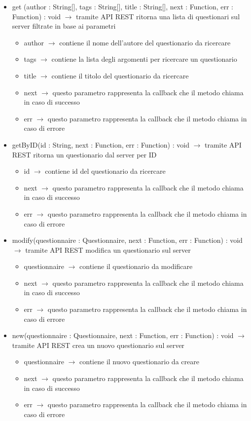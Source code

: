\begin{description}
\begin{itemize}
	\item get (author : String[], tags  : String[], title : String[], next : Function, err : Function) : void $\rightarrow$ tramite API REST ritorna una lista di questionari sul server filtrate in base ai parametri\begin{itemize}
		\item author $\rightarrow$ contiene il nome dell'autore del questionario da ricercare
		\item tags  $\rightarrow$ contiene la lista degli argomenti per ricercare un questionario
		\item title $\rightarrow$ contiene il titolo del questionario da ricercare
		\item next $\rightarrow$ questo parametro rappresenta la callback che il metodo chiama in caso di successo
		\item err $\rightarrow$ questo parametro rappresenta la callback che il metodo chiama in caso di errore
	\end{itemize}
	
	\item getByID(id : String, next : Function, err : Function) : void $\rightarrow$ tramite API REST ritorna un questionario dal server per ID\begin{itemize}
		\item id $\rightarrow$ contiene id del questionario da ricercare
		\item next $\rightarrow$ questo parametro rappresenta la callback che il metodo chiama in caso di successo
		\item err $\rightarrow$ questo parametro rappresenta la callback che il metodo chiama in caso di errore
	\end{itemize}
	
	\item modify(questionnaire : Questionnaire, next : Function, err : Function) : void $\rightarrow$ tramite API REST modifica un questionario sul server\begin{itemize}
		\item questionnaire $\rightarrow$ contiene il questionario da modificare
		\item next $\rightarrow$ questo parametro rappresenta la callback che il metodo chiama in caso di successo
		\item err $\rightarrow$ questo parametro rappresenta la callback che il metodo chiama in caso di errore
	\end{itemize}
	
	\item new(questionnaire : Questionnaire, next : Function, err : Function) : void $\rightarrow$ tramite API REST crea un nuovo questionario sul server\begin{itemize}
		\item questionnaire $\rightarrow$ contiene il nuovo questionario da creare
		\item next $\rightarrow$ questo parametro rappresenta la callback che il metodo chiama in caso di successo
		\item err $\rightarrow$ questo parametro rappresenta la callback che il metodo chiama in caso di errore
	\end{itemize}
	

\end{itemize}
\end{description}
